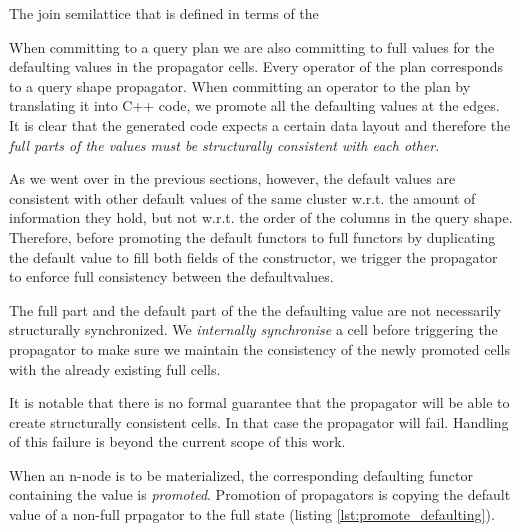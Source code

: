 \begin{code}
  \label{lst:defaulting_semigroup}
  \caption{The join semilattice that is defined in terms of the}
\end{code}

When committing to a query plan we are also committing to full values
for the defaulting values in the propagator cells. Every operator of
the plan corresponds to a query shape propagator. When committing an
operator to the plan by translating it into C++ code, we promote all
the defaulting values at the edges. It is clear that the generated
code expects a certain data layout and therefore the \emph{full parts
  of the values must be structurally consistent with each other}. 
  
As we went over in the previous sections, however, the default values are
consistent with other default values of the same cluster w.r.t. the amount of information they hold, 
but not w.r.t. the order of the columns in the query shape. Therefore, before promoting the
default functors to full functors by duplicating the default value to fill both
fields of the  constructor, we trigger the propagator to enforce
full consistency between the defaultvalues.

The full part and the default part of the the defaulting value are not
necessarily structurally synchronized. We \emph{internally synchronise} a
cell before triggering the propagator to make sure we maintain the
consistency of the newly promoted cells with the already existing full
cells.

It is notable that there is no formal guarantee that the propagator
will be able to create structurally consistent cells. In that case the
propagator will fail. Handling of this failure is beyond the current
scope of this work.

When an n-node is to be materialized, the corresponding defaulting
functor containing the value is \emph{promoted}.  Promotion of propagators
is copying the default value of a non-full prpagator to the full
state (listing \ref{lst:promote_defaulting}).


